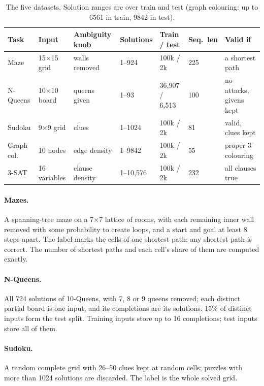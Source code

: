 \documentclass[11pt]{article}
\begin{document}
\begin{table}[h]
\centering\small
\begin{tabular}{@{}lllllll@{}}
\toprule
Task & Input & Ambiguity knob & Solutions & Train / test & Seq.\ len & Valid if \\
\midrule
Maze & 15$\times$15 grid & walls removed & 1--924 & 100k / 2k & 225 & a shortest path \\
N-Queens & 10$\times$10 board & queens given & 1--93 & 36{,}907 / 6{,}513 & 100 & no attacks, givens kept \\
Sudoku & 9$\times$9 grid & clues & 1--1024 & 100k / 2k & 81 & valid, clues kept \\
Graph col. & 10 nodes & edge density & 1--9842 & 100k / 2k & 55 & proper 3-colouring \\
3-SAT & 16 variables & clause density & 1--10{,}576 & 100k / 2k & 232 & all clauses true \\
\bottomrule
\end{tabular}
\caption{The five datasets. Solution ranges are over train and test (graph colouring: up to 6561 in train, 9842 in
test).}
\label{tab:datasets}
\end{table}

\paragraph{Mazes.} A spanning-tree maze on a 7$\times$7 lattice of rooms, with each remaining inner wall removed with
some probability to create loops, and a start and goal at least 8 steps apart. The label marks the cells of one
shortest path; any shortest path is correct. The number of shortest paths and each cell's share of them are computed
exactly.

\paragraph{N-Queens.} All 724 solutions of 10-Queens, with 7, 8 or 9 queens removed; each distinct partial board is
one input, and its completions are its solutions. 15\% of distinct inputs form the test split. Training inputs store
up to 16 completions; test inputs store all of them.

\paragraph{Sudoku.} A random complete grid with 26--50 clues kept at random cells; puzzles with more than 1024
solutions are discarded. The label is the whole solved grid.
\end{document}
